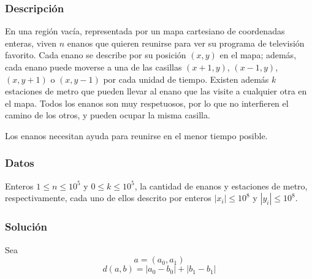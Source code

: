 %
%
%
%

\subsubsection{Descripción}

En una región vacía, representada por un mapa cartesiano de coordenadas enteras, viven \(n\) enanos que quieren reunirse para ver su programa de televisión favorito. Cada enano se describe por su posición \(\left(x,y\right)\) en el mapa; además, cada enano puede moverse a una de las casillas \(\left(x+1,y\right)\), \(\left(x-1,y\right)\), \(\left(x,y+1\right)\) o \(\left(x,y-1\right)\) por cada unidad de tiempo. Existen además \(k\) estaciones de metro que pueden llevar al enano que las visite a cualquier otra en el mapa. Todos los enanos son muy respetuosos, por lo que no interfieren el camino de los otros, y pueden ocupar la misma casilla.

Los enanos necesitan ayuda para reunirse en el menor tiempo posible.

\subsubsection{Datos}

Enteros \(1\leq n\leq10^5\) y \(0\leq k\leq10^5\), la cantidad de enanos y estaciones de metro, respectivamente, cada uno de ellos descrito por enteros \(|x_i|\leq 10^8\) y \(|y_i|\leq 10^8\).

\subsubsection{Solución}

Sea
\begin{equation*}
  a=\left(a_0,a_1\right)
\end{equation*}
\begin{equation}
  d(a,b)=\left\lvert a_0-b_0\right\rvert+\left\lvert b_1-b_1\right\rvert 
\end{equation}
 \\

